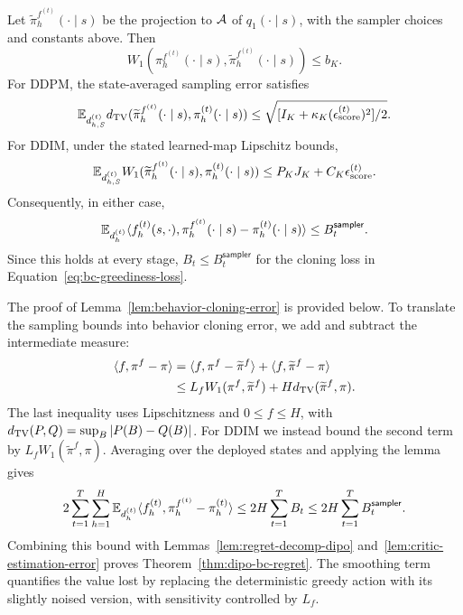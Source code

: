 \begin{lem}
Let $\widetilde\pi_h^{f^{(t)}}(\cdot\mid s)$ be the projection to ${\mathcal{A}}$ of $q_1(\cdot\mid s)$, with the sampler choices and constants above. Then
\[
 W_1(\pi_h^{f^{(t)}}(\cdot\mid s),\widetilde\pi_h^{f^{(t)}}(\cdot\mid s))\le b_K.
\]
For DDPM, the state-averaged sampling error satisfies
\[
 \mathbb{E}_{d_{h,S}^{(t)}}d_{\rm TV}(\widetilde\pi_h^{f^{(t)}}(\cdot\mid s),\pi_h^{(t)}(\cdot\mid s))
 \le\sqrt{[I_K+\kappa_K(\epsilon_{\text{score}}^{(t)})^2]/2}.
\]
For DDIM, under the stated learned-map Lipschitz bounds,
\[
 \mathbb{E}_{d_{h,S}^{(t)}}W_1(\widetilde\pi_h^{f^{(t)}}(\cdot\mid s),\pi_h^{(t)}(\cdot\mid s))
 \le P_KJ_K+C_K\epsilon_{\text{score}}^{(t)}.
\]
Consequently, in either case,
\[
 \mathbb{E}_{d_h^{(t)}}\langle f_h^{(t)}(s,\cdot),\pi_h^{f^{(t)}}(\cdot\mid s)-\pi_h^{(t)}(\cdot\mid s)\rangle
 \le B_t^{\mathsf{sampler}}.
\]
Since this holds at every stage, $B_t\le B_t^{\mathsf{sampler}}$ for the cloning loss in Equation~\ref{eq:bc-greediness-loss}.
\label{lem:behavior-cloning-error}
\end{lem}
The proof of Lemma~\ref{lem:behavior-cloning-error} is provided below.
To translate the sampling bounds into behavior cloning error, we add and subtract the intermediate measure:
\begin{align*}
 \langle f,\pi^f-\pi\rangle
 &=\langle f,\pi^f-\widetilde\pi^f\rangle+\langle f,\widetilde\pi^f-\pi\rangle\\
 &\le L_fW_1(\pi^f,\widetilde\pi^f)+H d_{\rm TV}(\widetilde\pi^f,\pi).
\end{align*}
The last inequality uses Lipschitzness and $0\le f\le H$, with $d_{\rm TV}(P,Q)=\sup_B|P(B)-Q(B)|$. For DDIM we instead bound the second term by $L_fW_1(\widetilde\pi^f,\pi)$. Averaging over the deployed states and applying the lemma gives
\[
 2\sum_{t=1}^T\sum_{h=1}^H\mathbb{E}_{d_h^{(t)}}
 \langle f_h^{(t)},\pi_h^{f^{(t)}}-\pi_h^{(t)}\rangle
 \le 2H\sum_{t=1}^T B_t
 \le 2H\sum_{t=1}^T B_t^{\mathsf{sampler}}.
\]
Combining this bound with Lemmas~\ref{lem:regret-decomp-dipo} and~\ref{lem:critic-estimation-error} proves Theorem~\ref{thm:dipo-bc-regret}. The smoothing term quantifies the value lost by replacing the deterministic greedy action with its slightly noised version, with sensitivity controlled by $L_f$.
